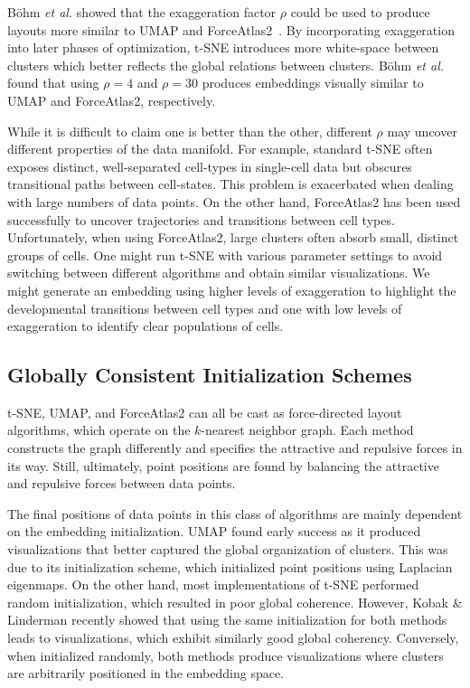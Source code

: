 \documentclass[twocolumn]{bmcart}
\begin{document}
B{\"o}hm \textit{et al.} showed that the exaggeration factor $\rho$
could be used to produce layouts more similar to UMAP and
ForceAtlas2~\cite{bohm2020unifying}. By incorporating exaggeration
into later phases of optimization, t-SNE introduces more white-space
between clusters which better reflects the global relations between
clusters. B{\"o}hm \textit{et al.} found that using $\rho=4$ and
$\rho=30$ produces embeddings visually similar to UMAP and
ForceAtlas2, respectively.

While it is difficult to claim one is better than the other, different
$\rho$ may uncover different properties of the data manifold. For
example, standard t-SNE often exposes distinct, well-separated
cell-types in single-cell data but obscures transitional paths between
cell-states. This problem is exacerbated when dealing with large
numbers of data points. On the other hand, ForceAtlas2 has been used
successfully to uncover trajectories and transitions between cell
types. Unfortunately, when using ForceAtlas2, large clusters often
absorb small, distinct groups of cells. One might run t-SNE with
various parameter settings to avoid switching between different
algorithms and obtain similar visualizations. We might generate an
embedding using higher levels of exaggeration to highlight the
developmental transitions between cell types and one with low levels
of exaggeration to identify clear populations of cells.

\subsection*{Globally Consistent Initialization Schemes}

t-SNE, UMAP, and ForceAtlas2 can all be cast as force-directed layout
algorithms, which operate on the $k$-nearest neighbor graph. Each
method constructs the graph differently and specifies the attractive
and repulsive forces in its way. Still, ultimately, point positions
are found by balancing the attractive and repulsive forces between
data points.

The final positions of data points in this class of algorithms are
mainly dependent on the embedding initialization. UMAP found early
success as it produced visualizations that better captured the global
organization of clusters. This was due to its initialization scheme,
which initialized point positions using Laplacian eigenmaps. On the
other hand, most implementations of t-SNE performed random
initialization, which resulted in poor global coherence. However,
Kobak \& Linderman recently showed that using the same initialization
for both methods leads to visualizations, which exhibit similarly good
global coherency. Conversely, when initialized randomly, both methods
produce visualizations where clusters are arbitrarily positioned in
the embedding space.
\end{document}
